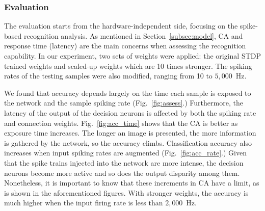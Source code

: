 \subsubsection{Evaluation}
The evaluation starts from the hardware-independent side, focusing on the spike-based recognition analysis.
As mentioned in Section~\ref{subsec:model}, CA and response time (latency) are the main concerns when assessing the recognition capability.
In our experiment, two sets of weights were applied: the original STDP trained weights and scaled-up weights which are 10 times stronger.
The spiking rates of the testing samples were also modified, ranging from 10 to $5,000$~Hz.

We found that accuracy depends largely on the time each sample is exposed to the network and the sample spiking rate (Fig.~\ref{fig:assess}.)
Furthermore, the latency of the output of the decision neurons is affected by both the spiking rate and connection weights.
Fig.~\ref{fig:acc_time} shows that the CA is better as exposure time increases. The longer an image is presented, the more information is gathered by the network, so the accuracy climbs.
Classification accuracy also increases when input spiking rates are augmented (Fig.~\ref{fig:acc_rate}.) Given that the spike trains injected into the network are more intense, the decision neurons become more active and so does the output disparity among them.
Nonetheless, it is important to know that these increments in CA have a limit, as is shown in the aforementioned figures.
With stronger weights, the accuracy is much higher when the input firing rate is less than $2,000$~Hz.



